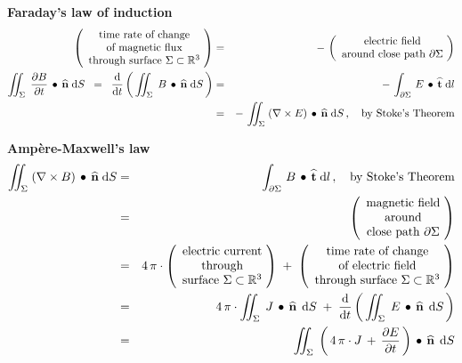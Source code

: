 
\vskip 0.5cm
\noindent
\textbf{Faraday's law of induction}
\begin{eqnarray*}
	\left(\begin{array}{c}
	\textnormal{time rate of change}
	\\
	\textnormal{of magnetic flux}
	\\
	\textnormal{through surface $\Sigma \subset \Re^{3}$}
	\end{array}\!\right)
&=&
	-\,\left(\begin{array}{c}
	\textnormal{electric field}
	\\
	\textnormal{around close path $\partial \Sigma$}
	\end{array}\!\right)
\\
\int\!\!\!\!\int_{\Sigma}\; \dfrac{\partial B}{\partial t} \,\bullet\, \widehat{\mathbf{n}}\;\d S
\;\; = \;\;
\dfrac{\d}{\d t}\left(\,\int\!\!\!\!\int_{\Sigma}\; B \,\bullet\, \widehat{\mathbf{n}}\;\d S\,\right)
&=&
	-\,\int_{\partial\Sigma}\, E \,\bullet\, \widehat{\mathbf{t}} \;\d l
\\
&=&
	-\,\int\!\!\!\!\int_{\Sigma}\; (\nabla \times E) \,\bullet\, \widehat{\mathbf{n}} \;\d S\,,
	\quad
	\textnormal{by Stoke's Theorem}
\end{eqnarray*}


\vskip 0.5cm
\noindent
\textbf{Amp\`{e}re-Maxwell's law}
\begin{eqnarray*}
\int\!\!\!\!\int_{\Sigma}\; (\nabla \times B) \,\bullet\, \widehat{\mathbf{n}} \;\d S
& = &
\int_{\partial\Sigma}\, B \,\bullet\, \widehat{\mathbf{t}} \;\d l\,,
\quad
\textnormal{by Stoke's Theorem}
\\
&=&
	\left(\begin{array}{c}
	\textnormal{magnetic field}
	\\
	\textnormal{around}
	\\
	\textnormal{close path $\partial\Sigma$}
	\end{array}\!\right)
\\
&=&
	4\,\pi\cdot\left(\begin{array}{c}
	\textnormal{electric current}
	\\
	\textnormal{through}
	\\
	\textnormal{surface $\Sigma \subset \Re^{3}$}
	\end{array}\!\right)
	\; + \;
	\left(\begin{array}{c}
	\textnormal{time rate of change}
	\\
	\textnormal{of electric field}
	\\
	\textnormal{through surface $\Sigma \subset \Re^{3}$}
	\end{array}\!\right)
\\
&=&
	4\,\pi\cdot\int\!\!\!\!\int_{\Sigma}\; J \,\bullet\, \widehat{\mathbf{n}} \,\;\d S
	\; + \;
	\dfrac{\d}{\d t}\left(\,\int\!\!\!\!\int_{\Sigma}\; E \,\bullet\, \widehat{\mathbf{n}} \,\;\d S\,\right)
\\
&=&
	\int\!\!\!\!\int_{\Sigma}\; \left(\,4\,\pi\cdot J \,+\, \dfrac{\partial E}{\partial t} \,\right)\,\bullet\, \widehat{\mathbf{n}} \,\;\d S
\end{eqnarray*}


